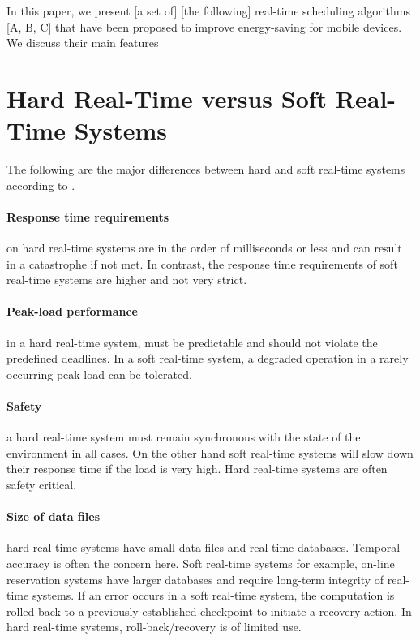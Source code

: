\documentclass[10pt,article]{IEEEtran}
\begin{document}
In this paper, we present [a set of] [the following] real-time scheduling algorithms  [A, B, C] that have been proposed to improve energy-saving for mobile devices. We discuss their main features

\section{Hard Real-Time versus Soft Real-Time Systems}
The following are the major differences between hard and soft real-time systems according to \cite{juvva}. 
\paragraph{Response time requirements} on hard real-time systems are in the order of milliseconds or less and can result in a catastrophe if not met. In contrast, the response time requirements of soft real-time systems are higher and not very strict. 

\paragraph{Peak-load performance} in a hard real-time system, must be predictable and should not violate the predefined deadlines. In a soft real-time system, a degraded operation in a rarely occurring peak load can be tolerated. 

\paragraph{Safety} a hard real-time system must remain synchronous with the state of the environment in all cases. On the other hand soft real-time systems will slow down their response time if the load is very high. Hard real-time systems are often safety critical. 

\paragraph{Size of data files} hard real-time systems have small data files and real-time databases. Temporal accuracy is often the concern here. Soft real-time systems for example, on-line reservation systems have larger databases and require long-term integrity of real-time systems. If an error occurs in a soft real-time system, the computation is rolled back to a previously established checkpoint to initiate a recovery action. In hard real-time systems, roll-back/recovery is of limited use.
 
\end{document}
